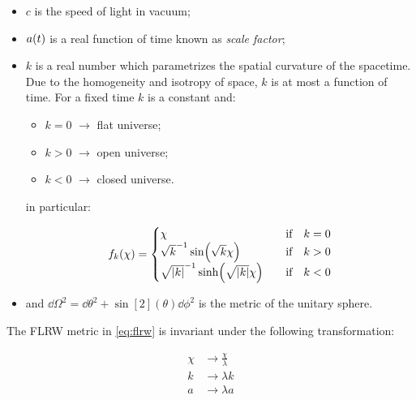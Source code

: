 \begin{itemize}
        \item $c$ is the speed of light in vacuum;
        \item $a\qty(t)$ is a real function of time known as \emph{scale factor};
        \item $k$ is a real number which parametrizes the spatial curvature of the
        spacetime. Due to the homogeneity and isotropy of space, $k$ is at most a
        function of time. For a fixed time $k$ is a constant and:

        \begin{itemize}
                \item $k = 0$ $\rightarrow$ flat universe;
                \item $k > 0$ $\rightarrow$ open universe;
                \item $k < 0$ $\rightarrow$ closed universe.
        \end{itemize}

        in particular:

        \begin{equation}
                f_k\qty(\chi) =
                        \begin{cases}
                                 \chi & \qif k = 0 \\
                                 \sqrt{k}^{-1} \sin(\sqrt{k} \chi) & \qif k > 0 \\
                                 \sqrt{\abs{k}}^{-1} \sinh(\sqrt{\abs{k}} \chi) & \qif k < 0
                        \end{cases}
        \end{equation}
        \item and $\dd{\Omega}^2 = \dd{\theta}^2 + \sin[2](\theta) \dd{\phi}^2$
        is the metric of the unitary sphere.
\end{itemize}

The FLRW metric in \autoref{eq:flrw} is invariant under the following transformation:

\begin{equation}
        \begin{split}
                \chi & \rightarrow \frac{\chi}{\lambda} \\
                k & \rightarrow \lambda k \\
                a & \rightarrow \lambda a
        \end{split}
\end{equation}

